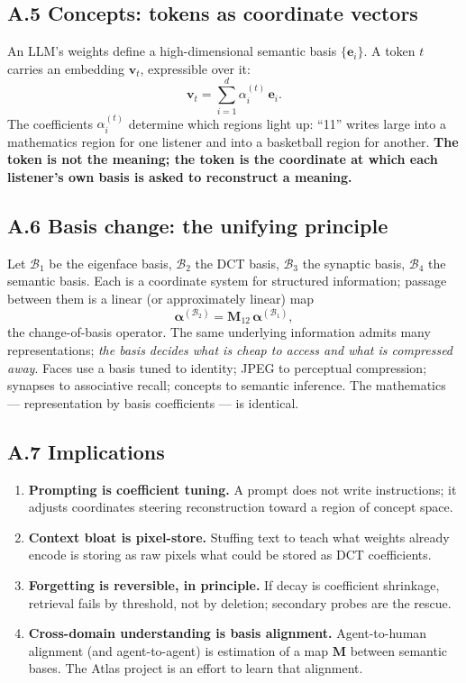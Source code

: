 \documentclass[12pt, a4paper]{article}
\begin{document}
\subsection*{A.5 Concepts: tokens as coordinate vectors}
An LLM's weights define a high-dimensional semantic basis $\{\mathbf{e}_i\}$. A token $t$ carries an embedding $\mathbf{v}_t$, expressible over it:
\begin{equation}
\mathbf{v}_t = \sum_{i=1}^{d} \alpha_i^{(t)}\, \mathbf{e}_i .
\end{equation}
The coefficients $\alpha_i^{(t)}$ determine which regions light up: ``11'' writes large into a mathematics region for one listener and into a basketball region for another. \textbf{The token is not the meaning; the token is the coordinate at which each listener's own basis is asked to reconstruct a meaning.}

\subsection*{A.6 Basis change: the unifying principle}
Let $\mathcal{B}_1$ be the eigenface basis, $\mathcal{B}_2$ the DCT basis, $\mathcal{B}_3$ the synaptic basis, $\mathcal{B}_4$ the semantic basis. Each is a coordinate system for structured information; passage between them is a linear (or approximately linear) map
\begin{equation}
\boldsymbol{\alpha}^{(\mathcal{B}_2)} = \mathbf{M}_{12}\, \boldsymbol{\alpha}^{(\mathcal{B}_1)} ,
\end{equation}
the change-of-basis operator. The same underlying information admits many representations; \emph{the basis decides what is cheap to access and what is compressed away}. Faces use a basis tuned to identity; JPEG to perceptual compression; synapses to associative recall; concepts to semantic inference. The mathematics --- representation by basis coefficients --- is identical.

\subsection*{A.7 Implications}
\begin{enumerate}
\item \textbf{Prompting is coefficient tuning.} A prompt does not write instructions; it adjusts coordinates steering reconstruction toward a region of concept space.
\item \textbf{Context bloat is pixel-store.} Stuffing text to teach what weights already encode is storing as raw pixels what could be stored as DCT coefficients.
\item \textbf{Forgetting is reversible, in principle.} If decay is coefficient shrinkage, retrieval fails by threshold, not by deletion; secondary probes are the rescue.
\item \textbf{Cross-domain understanding is basis alignment.} Agent-to-human alignment (and agent-to-agent) is estimation of a map $\mathbf{M}$ between semantic bases. The Atlas project is an effort to learn that alignment.
\end{enumerate}
\end{document}
